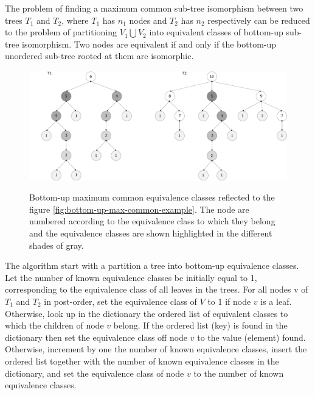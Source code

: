 \documentclass{report}
\begin{document}
The problem of finding a maximum common sub-tree isomorphism between two trees $ T_{1}$ and $ T_{2 }$, where $ T_{1}$ has $n_{1}$ nodes and $ T_{2}$ has $n_{2}$ respectively can be reduced to the problem of partitioning $ V_{1}\bigcup V_{2}$ into equivalent classes of bottom-up sub-tree isomorphism. Two nodes are equivalent if and only if the bottom-up unordered sub-tree rooted at them are isomorphic.

\begin{figure}[h]
  \centering
  \includegraphics[scale=0.45]{Figures/algorithms/BU/bottom-up-max-common-example-equivalence.pdf}\\[0.1cm]
  \caption[Bottom up unordered sub-tree isomorphism equivalence classes on trees] { Bottom-up maximum common equivalence classes reflected to the figure \ref{fig:bottom-up-max-common-example}. The node are numbered according to the equivalence class to which they belong and the equivalence classes are shown highlighted in the different shades of gray\cite{valiente}.}
  \label{fig:bottom-up-max-common-example-equivalence}
\end{figure}

The algorithm start with a partition a tree into bottom-up equivalence classes.
Let the number of known equivalence classes be initially equal to 1, corresponding to the equivalence class of all leaves in the trees. For all nodes v of $ T_{1}$ and $ T_{2 }$ in post-order, set the equivalence class of $V$ to 1 if node $v$ is a leaf. Otherwise, look up in the dictionary the ordered list of equivalent classes to which the children of node $v$ belong. If the ordered list (key) is found in the dictionary then set the equivalence class off node $v$ to the value (element) found. Otherwise, increment by one the number of known equivalence classes, insert the ordered list together with the number of known equivalence classes in the dictionary, and set the equivalence class of node $v$ to the number of known equivalence classes.
\end{document}
